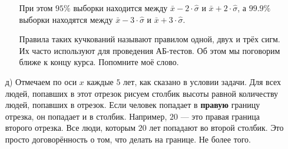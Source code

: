 \documentclass[12pt, a4paper, oneside]{article}
\begin{document}
\begin{enumerate}
\begin{itemize}
		При этом $95 \%$ выборки находится между $\bar x - 2 \cdot \hat \sigma$ и $\bar x + 2 \cdot \hat \sigma$, а $99.9\%$ выборки находятся между $\bar x - 3 \cdot \hat \sigma$ и $\bar x + 3 \cdot \hat \sigma$. 
		
		Правила таких кучкований называют правилом одной, двух и трёх сигм. Их часто используют для проведения АБ-тестов. Об этом мы поговорим ближе к концу курса. Попомните моё слово. 
	\end{itemize}
	
	
	\item[д)] Отмечаем по оси $x$ каждые $5$  лет, как сказано в условии задачи. Для всех людей, попавших в этот отрезок рисуем столбик высоты равной количеству людей, попавших в отрезок. Если человек попадает в \textbf{правую} границу отрезка, он попадает и в столбик. Например, $20$ --- это правая граница второго отрезка. Все люди, которым $20$ лет попадают во второй столбик. Это просто договорённость о том, что делать на границе. Не более того. 
	

\end{enumerate}
\end{document}
